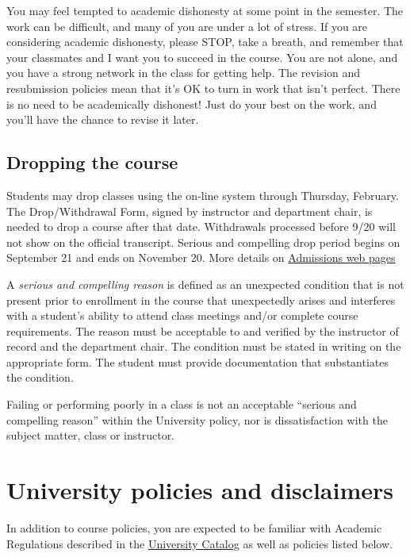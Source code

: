 You may feel tempted to academic dishonesty at some point in the
semester. The work can be difficult, and many of you are under a lot of
stress. If you are considering academic dishonesty, please STOP, take a
breath, and remember that your classmates and I want you to succeed in
the course. You are not alone, and you have a strong network in the
class for getting help. The revision and resubmission policies mean that
it's OK to turn in work that isn't perfect. There is no need to be
academically dishonest! Just do your best on the work, and you'll have
the chance to revise it later.

\hypertarget{dropping-the-course}{%
\subsection{Dropping the course}\label{dropping-the-course}}

Students may drop classes using the on-line system through Thursday,
February. The Drop/Withdrawal Form, signed by instructor and department
chair, is needed to drop a course after that date. Withdrawals processed
before 9/20 will not show on the official transcript. Serious and
compelling drop period begins on September 21 and ends on November 20.
More details on
\href{http://fresnostate.edu/studentaffairs/are/registration/add-drop-deadlines.html}{Admissions
web pages}

A \emph{serious and compelling reason} is defined as an unexpected
condition that is not present prior to enrollment in the course that
unexpectedly arises and interferes with a student's ability to attend
class meetings and/or complete course requirements. The reason must be
acceptable to and verified by the instructor of record and the
department chair. The condition must be stated in writing on the
appropriate form. The student must provide documentation that
substantiates the condition.

Failing or performing poorly in a class is not an acceptable ``serious
and compelling reason'' within the University policy, nor is
dissatisfaction with the subject matter, class or instructor.

\hypertarget{university-policies-and-disclaimers}{%
\section{University policies and
disclaimers}\label{university-policies-and-disclaimers}}

In addition to course policies, you are expected to be familiar with
Academic Regulations described in the
\href{http://www.fresnostate.edu/catalog/academic-regulations/}{University
Catalog} as well as policies listed below.

